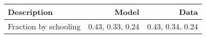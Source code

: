 \begin{tabular}{lrr}
\hline
Description & Model  & Data  \\ 
\hline
Fraction by schooling & 0.43, 0.33, 0.24  & 0.43, 0.34, 0.24  \\ 
\hline
\end{tabular}%
